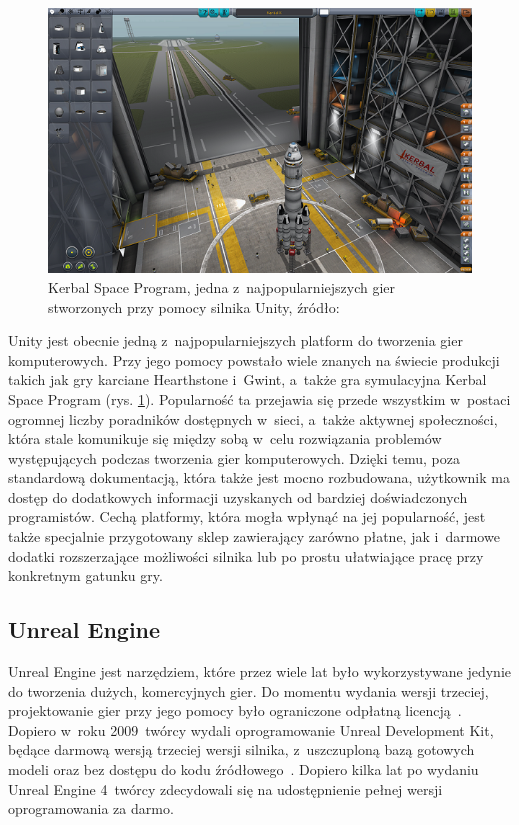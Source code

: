 \begin{figure}[h]
	\centering
	\includegraphics[width=0.7\linewidth]{images/kerbal_space_program.png}
	\caption{Kerbal Space Program, jedna z~najpopularniejszych gier stworzonych przy pomocy silnika Unity, źródło:~\cite{kerbal_your_enthusiasm}}
	\label{fig:kerbal_space_program}
\end{figure}

Unity jest obecnie jedną z~najpopularniejszych platform do tworzenia gier komputerowych. Przy jego pomocy powstało wiele znanych na świecie produkcji takich jak gry karciane Hearthstone i~Gwint, a~także gra symulacyjna Kerbal Space Program (rys. \ref{fig:kerbal_space_program}). Popularność ta przejawia się przede wszystkim w~postaci ogromnej liczby poradników dostępnych w~sieci, a~także aktywnej społeczności, która stale komunikuje się między sobą w~celu rozwiązania problemów występujących podczas tworzenia gier komputerowych. Dzięki temu, poza standardową dokumentacją, która także jest mocno rozbudowana, użytkownik ma dostęp do dodatkowych informacji uzyskanych od bardziej doświadczonych programistów. Cechą platformy, która mogła wpłynąć na jej popularność, jest także specjalnie przygotowany sklep zawierający zarówno płatne, jak i~darmowe dodatki rozszerzające możliwości silnika lub po prostu ułatwiające pracę przy konkretnym gatunku gry.

\subsection{Unreal Engine}
Unreal Engine jest narzędziem, które przez wiele lat było wykorzystywane jedynie do tworzenia dużych, komercyjnych gier. Do momentu wydania wersji trzeciej, projektowanie gier przy jego pomocy było ograniczone odpłatną licencją~\cite{unreal_manual}. Dopiero w~roku 2009~twórcy wydali oprogramowanie Unreal Development Kit, będące darmową wersją trzeciej wersji silnika, z~uszczuploną bazą gotowych modeli oraz bez dostępu do kodu źródłowego~\cite{udk_manual}. Dopiero kilka lat po wydaniu Unreal Engine 4~twórcy zdecydowali się na udostępnienie pełnej wersji oprogramowania za darmo. 

